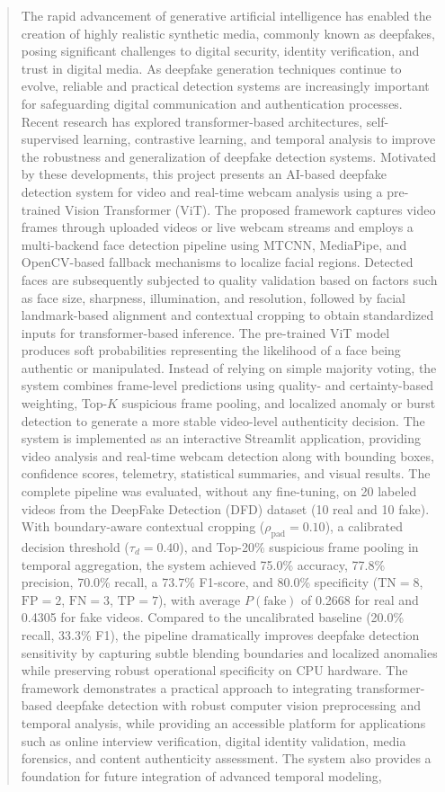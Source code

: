 \documentclass[conference]{IEEEtran}
\begin{document}
\begin{abstract}
The rapid advancement of generative artificial intelligence has enabled the creation of highly realistic synthetic media, commonly known as deepfakes, posing significant challenges to digital security, identity verification, and trust in digital media. As deepfake generation techniques continue to evolve, reliable and practical detection systems are increasingly important for safeguarding digital communication and authentication processes. Recent research has explored transformer-based architectures, self-supervised learning, contrastive learning, and temporal analysis to improve the robustness and generalization of deepfake detection systems. Motivated by these developments, this project presents an AI-based deepfake detection system for video and real-time webcam analysis using a pre-trained Vision Transformer (ViT). The proposed framework captures video frames through uploaded videos or live webcam streams and employs a multi-backend face detection pipeline using MTCNN, MediaPipe, and OpenCV-based fallback mechanisms to localize facial regions. Detected faces are subsequently subjected to quality validation based on factors such as face size, sharpness, illumination, and resolution, followed by facial landmark-based alignment and contextual cropping to obtain standardized inputs for transformer-based inference. The pre-trained ViT model produces soft probabilities representing the likelihood of a face being authentic or manipulated. Instead of relying on simple majority voting, the system combines frame-level predictions using quality- and certainty-based weighting, Top-$K$ suspicious frame pooling, and localized anomaly or burst detection to generate a more stable video-level authenticity decision. The system is implemented as an interactive Streamlit application, providing video analysis and real-time webcam detection along with bounding boxes, confidence scores, telemetry, statistical summaries, and visual results. The complete pipeline was evaluated, without any fine-tuning, on 20 labeled videos from the DeepFake Detection (DFD) dataset (10 real and 10 fake). With boundary-aware contextual cropping ($\rho_{\text{pad}} = 0.10$), a calibrated decision threshold ($\tau_d = 0.40$), and Top-20\% suspicious frame pooling in temporal aggregation, the system achieved 75.0\% accuracy, 77.8\% precision, 70.0\% recall, a 73.7\% F1-score, and 80.0\% specificity ($\mathrm{TN}=8$, $\mathrm{FP}=2$, $\mathrm{FN}=3$, $\mathrm{TP}=7$), with average $P(\text{fake})$ of 0.2668 for real and 0.4305 for fake videos. Compared to the uncalibrated baseline (20.0\% recall, 33.3\% F1), the pipeline dramatically improves deepfake detection sensitivity by capturing subtle blending boundaries and localized anomalies while preserving robust operational specificity on CPU hardware. The framework demonstrates a practical approach to integrating transformer-based deepfake detection with robust computer vision preprocessing and temporal analysis, while providing an accessible platform for applications such as online interview verification, digital identity validation, media forensics, and content authenticity assessment. The system also provides a foundation for future integration of advanced temporal modeling, 
\end{abstract}
\end{document}
